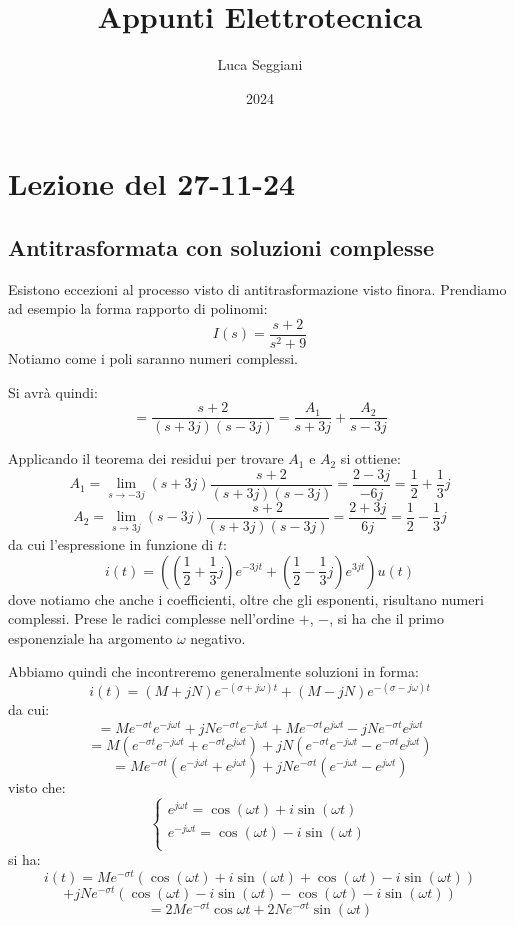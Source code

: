 \documentclass[a4paper,11pt]{article}
\title{Appunti Elettrotecnica}
\author{Luca Seggiani}
\date{2024}
\begin{document}
\section{Lezione del 27-11-24}

\thispagestyle{empty}
\pagestyle{fancy}

\subsection{Antitrasformata con soluzioni complesse}
Esistono eccezioni al processo visto di antitrasformazione visto finora.
Prendiamo ad esempio la forma rapporto di polinomi:
$$
I(s) = \frac{s + 2}{s^2 + 9}
$$
Notiamo come i poli saranno numeri complessi.

Si avrà quindi:
$$
= \frac{s + 2}{(s+3j)(s-3j)} = \frac{A_1}{s+3j} + \frac{A_2}{s-3j}
$$

Applicando il teorema dei residui per trovare $A_1$ e $A_2$ si ottiene:
$$
A_1 = \lim_{s\rightarrow -3j} (s + 3j) \frac{s + 2}{(s+3j)(s-3j)} = \frac{2-3j}{-6j} = \frac{1}{2} + \frac{1}{3}j
$$
$$
A_2 = \lim_{s\rightarrow 3j} (s - 3j) \frac{s + 2}{(s+3j)(s-3j)} = \frac{2+3j}{6j} = \frac{1}{2} - \frac{1}{3}j
$$
da cui l'espressione in funzione di $t$:
$$
i(t) = \left( \left( \frac{1}{2} + \frac{1}{3}j \right) e^{-3j t} + \left( \frac{1}{2} - \frac{1}{3}j \right) e^{3jt} \right) u(t)
$$
dove notiamo che anche i coefficienti, oltre che gli esponenti, risultano numeri complessi.
Prese le radici complesse nell'ordine $+$, $-$, si ha che il primo esponenziale ha argomento $\omega$ negativo.

Abbiamo quindi che incontreremo generalmente soluzioni in forma:
$$
i(t) = \left( M + jN \right) e^{-(\sigma + j \omega)t} + \left( M - jN \right) e^{-(\sigma - j \omega)t}
$$
da cui:
$$
= M e^{-\sigma t}e^{-j \omega t} + j N e^{-\sigma t}e^{-j \omega t} + M e^{-\sigma t}e^{j \omega t} - jN e^{-\sigma t}e^{j \omega t}
$$
$$
= M \left( e^{- \sigma t}e^{-j \omega t} + e^{- \sigma t}e^{j \omega t} \right) + j N  \left( e^{-\sigma t}e^{-j \omega t} - e^{-\sigma t}e^{j \omega t} \right)
$$
$$
= M e^{- \sigma t} \left( e^{-j \omega t} + e^{j \omega t} \right) + j N e^{-\sigma t} \left( e^{-j \omega t} - e^{j \omega t} \right)
$$
visto che:
\[
	\begin{cases}
		e^{j \omega t} = \cos(\omega t) + i \sin(\omega t) \\ 	
		e^{-j \omega t} = \cos(\omega t) - i \sin(\omega t) \\ 	
	\end{cases}
\]
si ha:
$$
i(t) = M e^{-\sigma t} ( \cos(\omega t) + i \sin(\omega t) + \cos(\omega t) - i \sin(\omega t) ) 
$$
$$
+ j N e^{-\sigma t} ( \cos(\omega t) - i \sin(\omega t) - \cos(\omega t) - i \sin(\omega t) )
$$
$$
= 2 M e^{-\sigma t} \cos{\omega t} + 2 N e^{-\sigma t} \sin(\omega t)
$$
\end{document}
